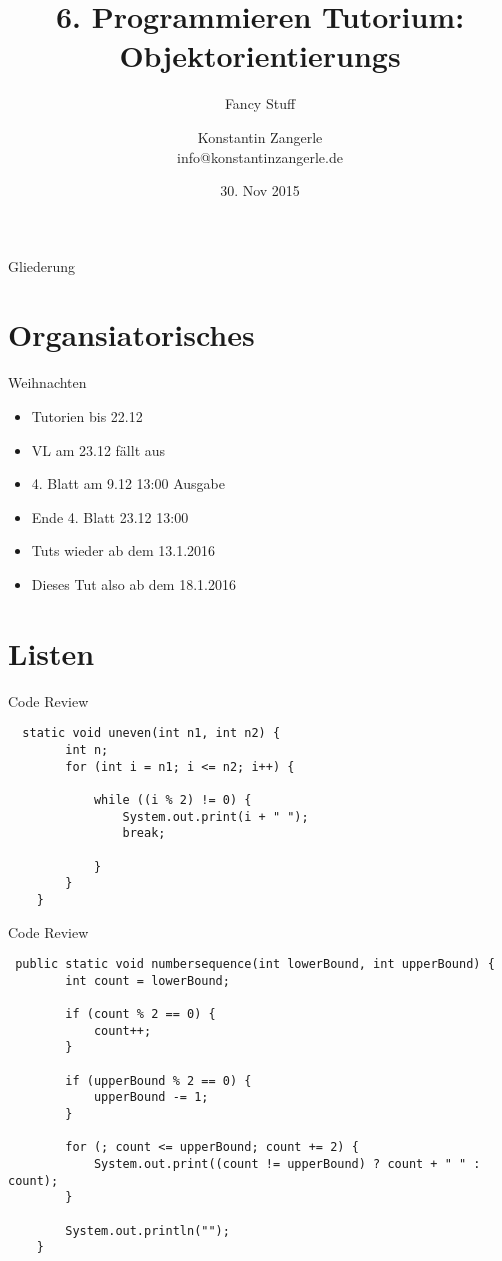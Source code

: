 \documentclass[18pt]{beamer}
\title[Programmieren Tutorium]{6. Programmieren Tutorium:\texorpdfstring{\\}{} Objektorientierungs}
\subtitle{Fancy Stuff}
\author{Konstantin Zangerle \texorpdfstring{\\}{} info@konstantinzangerle.de}
\date{30. Nov 2015}
\begin{document}

\begin{frame}
\titlepage
\end{frame}

\begin{frame}{Gliederung}
\tableofcontents
\end{frame}

\section{Organsiatorisches}

\begin{frame}{Weihnachten}
 \begin{itemize}
  \item Tutorien bis 22.12
  \item VL am 23.12 fällt aus
  \item 4. Blatt am 9.12 13:00 Ausgabe
  \item Ende 4. Blatt 23.12 13:00
  \item Tuts wieder ab dem 13.1.2016
  \item Dieses Tut also ab dem 18.1.2016
 \end{itemize}

\end{frame}

\section{Listen}
\begin{frame}[fragile]{Code Review}
 \begin{lstlisting}
  static void uneven(int n1, int n2) {
        int n;
        for (int i = n1; i <= n2; i++) {
            
            while ((i % 2) != 0) {
                System.out.print(i + " ");
                break;

            }
        }
    }
 \end{lstlisting}
\end{frame}

\begin{frame}[fragile]{Code Review}
 \begin{lstlisting}
 public static void numbersequence(int lowerBound, int upperBound) {
        int count = lowerBound;

        if (count % 2 == 0) {
            count++;
        }

        if (upperBound % 2 == 0) {
            upperBound -= 1;
        }

        for (; count <= upperBound; count += 2) {
            System.out.print((count != upperBound) ? count + " " : count);
        }

        System.out.println("");
    }


 \end{lstlisting}
\end{frame}
\end{document}
